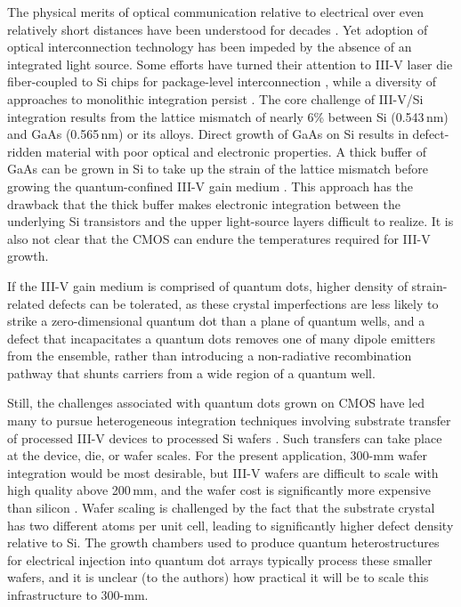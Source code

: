 \documentclass[twocolumn]{article}
\begin{document}
The physical merits of optical communication relative to electrical over even relatively short distances have been understood for decades \cite{gole1984,mi1989,mi2000}. Yet adoption of optical interconnection technology has been impeded by the absence of an integrated light source. Some efforts have turned their attention to III-V laser die fiber-coupled to Si chips for package-level interconnection \cite{suwa2015}, while a diversity of approaches to monolithic integration persist \cite{crsa2017,zhha2018,huli2019,szha2019,haxu2021}. The core challenge of III-V/Si integration results from the lattice mismatch of nearly 6\% between Si (0.543\,nm) and GaAs (0.565\,nm) or its alloys. Direct growth of GaAs on Si results in defect-ridden material with poor optical and electronic properties. A thick buffer of GaAs can be grown in Si to take up the strain of the lattice mismatch before growing the quantum-confined III-V gain medium \cite{chli2016}. This approach has the drawback that the thick buffer makes electronic integration between the underlying Si transistors and the upper light-source layers difficult to realize. It is also not clear that the CMOS can endure the temperatures required for III-V growth. 

If the III-V gain medium is comprised of quantum dots, higher density of strain-related defects can be tolerated, as these crystal imperfections are less likely to strike a zero-dimensional quantum dot than a plane of quantum wells, and a defect that incapacitates a quantum dots removes one of many dipole emitters from the ensemble, rather than introducing a non-radiative recombination pathway that shunts carriers from a wide region of a quantum well. 

Still, the challenges associated with quantum dots grown on CMOS have led many to pursue heterogeneous integration techniques involving substrate transfer of processed III-V devices to processed Si wafers \cite{noju2018}. Such transfers can take place at the device, die, or wafer scales. For the present application, 300-mm wafer integration would be most desirable, but III-V wafers are difficult to scale with high quality above 200\,mm, and the wafer cost is significantly more expensive than silicon \cite{noju2018}. Wafer scaling is challenged by the fact that the substrate crystal has two different atoms per unit cell, leading to significantly higher defect density relative to Si. The growth chambers used to produce quantum heterostructures for electrical injection into quantum dot arrays typically process these smaller wafers, and it is unclear (to the authors) how practical it will be to scale this infrastructure to 300-mm. 
\end{document}
